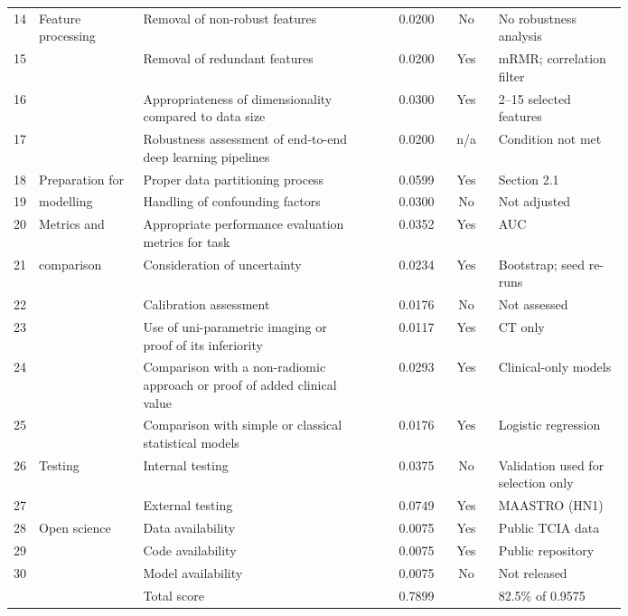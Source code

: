 \begin{longtable}{@{}L{0.04\linewidth}L{0.17\linewidth}L{0.37\linewidth}rcL{0.21\linewidth}@{}}
14 & Feature processing & Removal of non-robust features & 0.0200 & No & No robustness analysis \\
15 &  & Removal of redundant features & 0.0200 & Yes & mRMR; correlation filter \\
16 &  & Appropriateness of dimensionality compared to data size & 0.0300 & Yes & 2--15 selected features \\
17 &  & Robustness assessment of end-to-end deep learning pipelines & 0.0200 & n/a & Condition not met \\
18 & Preparation for & Proper data partitioning process & 0.0599 & Yes & Section 2.1 \\
19 & \quad modelling & Handling of confounding factors & 0.0300 & No & Not adjusted \\
20 & Metrics and & Appropriate performance evaluation metrics for task & 0.0352 & Yes & AUC \\
21 & \quad comparison & Consideration of uncertainty & 0.0234 & Yes & Bootstrap; seed re-runs \\
22 &  & Calibration assessment & 0.0176 & No & Not assessed \\
23 &  & Use of uni-parametric imaging or proof of its inferiority & 0.0117 & Yes & CT only \\
24 &  & Comparison with a non-radiomic approach or proof of added clinical value & 0.0293 & Yes & Clinical-only models \\
25 &  & Comparison with simple or classical statistical models & 0.0176 & Yes & Logistic regression \\
26 & Testing & Internal testing & 0.0375 & No & Validation used for selection only \\
27 &  & External testing & 0.0749 & Yes & MAASTRO (HN1) \\
28 & Open science & Data availability & 0.0075 & Yes & Public TCIA data \\
29 &  & Code availability & 0.0075 & Yes & Public repository \\
30 &  & Model availability & 0.0075 & No & Not released \\
\midrule
 & & Total score & 0.7899 & & 82.5\% of 0.9575 \\
\end{longtable}


